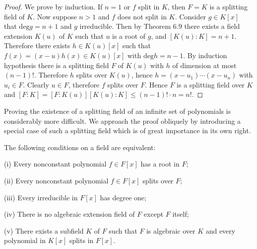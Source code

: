 \begin{proof}
We prove by induction. If $n=1$ or $f$ split in $K$, then $F=K$ is a splitting field of $K$. Now suppose $n>1$ and $f$ does not split in $K$. Consider $g\in K[x]$ that $\mathrm{deg}g=n+1$ and $g$ irreducible. Then by Theorem 6.9 there exists a field extension $K(u)$ of $K$ such that $u$ is a root of $g$, and $[K(u):K]=n+1$. Therefore there exists $h\in K(u)[x]$ such that $f(x)=(x-u)h(x)\in K(u)[x]$ with $\mathrm{deg}h=n-1$. By induction hypothesis there is a splitting field $F$ of $K(u)$ with $h$ of dimension at most $(n-1)!$. Therefore $h$ splits over $K(u)$, hence $h=(x-u_1)\cdots(x-u_n)$ with $u_i\in F$. Clearly $u\in F$, therefore $f$ splits over $F$. Hence $F$ is a splitting field over $K$ and $[F:K]=[F:K(u)][K(u):K]\le (n-1)!\cdot n=n!$.
\end{proof}
Proving the existence of a splitting field of an infinite set of polynomials is considerably more difficult. We approach the proof obliquely by introducing a special case of such a splitting field which is of great importance in its own right.
\begin{theorem}
The following conditions on a field are equivalent: \par
(i) Every nonconstant polynomial $f\in F[x]$ has a root in $F$;\par
(ii) Every nonconstant polynomial $f\in F[x]$ splits over $F$;\par
(iii) Every irreducible in $F[x]$ has degree one;\par
(iv) There is no algebraic extension field of $F$ except $F$ itself;\par
(v) There exists a subfield $K$ of $F$ such that $F$ is algebraic over $K$ and every polynomial in $K[x]$ splits in $F[x]$.
\end{theorem}
